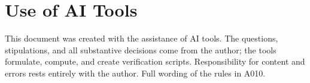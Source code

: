\section{Use of AI Tools}

This document was created with the assistance of AI tools. The questions,
stipulations, and all substantive decisions come from the author; the tools
formulate, compute, and create verification scripts.
Responsibility for content and errors rests entirely with the author.
Full wording of the rules in A010.
